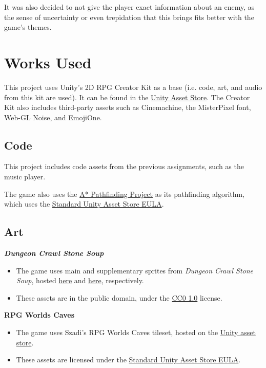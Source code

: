 \documentclass[10pt]{article}
\begin{document}
It was also decided to not give the player exact information about an enemy, as the sense of uncertainty or even trepidation
that this brings fits better with the game's themes.

\section{Works Used}

This project uses Unity's 2D RPG Creator Kit as a base (i.e. code, art, and audio from this kit are used).
It can be found in the \href{https://assetstore.unity.com/packages/templates/tutorials/creator-kit-rpg-149309}{Unity Asset Store}.
The Creator Kit also includes third-party assets such as Cinemachine, the MisterPixel font, Web-GL Noise, and EmojiOne.


\subsection{Code}

This project includes code assets from the previous assignments, such as the music player.

The game also uses the \href{https://arongranberg.com/astar/}{A* Pathfinding Project} as its pathfinding algorithm,
which uses the \href{https://unity3d.com/legal/as_terms}{Standard Unity Asset Store EULA}.

\subsection{Art}

\textbf{\textit{Dungeon Crawl Stone Soup}}
\begin{itemize}
    \item The game uses main and supplementary sprites from \textit{Dungeon Crawl Stone Soup}, hosted \href{https://opengameart.org/content/dungeon-crawl-32x32-tiles}{here}
        and \href{https://opengameart.org/content/dungeon-crawl-32x32-tiles-supplemental}{here}, respectively.
    \item These assets are in the public domain, under the \href{https://creativecommons.org/publicdomain/zero/1.0/}{CC0 1.0} license.
\end{itemize}

\textbf{RPG Worlds Caves}
\begin{itemize}
    \item The game uses Szadi's RPG Worlds Caves tileset, hosted on the \href{https://assetstore.unity.com/packages/2d/environments/rpg-worlds-caves-167274}{Unity asset store}.
    \item These assets are licensed under the \href{https://unity3d.com/legal/as_terms}{Standard Unity Asset Store EULA}.
\end{itemize}
\end{document}
